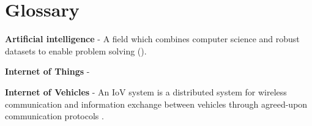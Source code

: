 \documentclass[14pt, a4paper, english]{report}
\begin{document}
	
%	
%	
%	
	
	\chapter*{Glossary}
	
	\textbf{Artificial intelligence} - A field which combines computer science and robust datasets to enable problem solving (\cite{artificial_intelligence}).
	
	\textbf{Internet of Things} - 
	
	\textbf{Internet of Vehicles} - An IoV system is a distributed system for wireless communication and information exchange between vehicles through agreed-upon communication protocols \parencite{chinese_iov}.
	
	\clearpage
    \printbibliography
    \appendix
    
    
    
    
\end{document}
